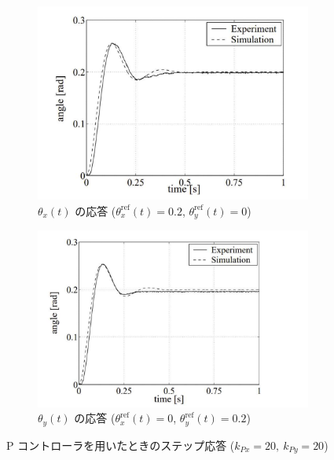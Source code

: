 \begin{figure}[htbp]
    \centering
    \begin{subfigure}[b]{0.45\linewidth}
        \centering
        \includegraphics[width=\linewidth]{figure/thetax_response2.pdf}
        \caption{$\theta_x(t)$ の応答 ($\theta_x^{\mathrm{ref}}(t) = 0.2$, $\theta_y^{\mathrm{ref}}(t) = 0$)}
    \end{subfigure}
    \hfill
    \begin{subfigure}[b]{0.45\linewidth}
        \centering
        \includegraphics[width=\linewidth]{figure/thetay_response2.pdf}
        \caption{$\theta_y(t)$ の応答 ($\theta_x^{\mathrm{ref}}(t) = 0$, $\theta_y^{\mathrm{ref}}(t) = 0.2$)}
    \end{subfigure}
    \caption{P コントローラを用いたときのステップ応答 ($k_{Px}=20,\ k_{Py}=20$)}
    \label{fig:step_response2}
\end{figure}
